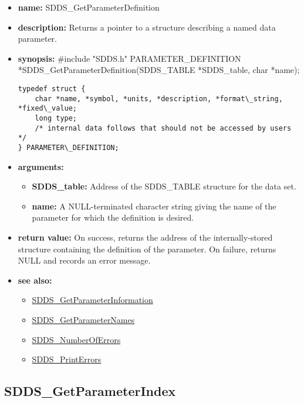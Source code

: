 \documentclass[11pt]{article}
\newcommand{\progref}[1]{\hyperref{SDDS_#1}{{\tt SDDS\_#1} (}{)}{SDDS_#1}}
\begin{document}
\begin{itemize}
\item {\bf name:}\newline
SDDS\_GetParameterDefinition
\item {\bf description:}\newline
Returns a pointer to a structure describing a named data parameter.
\item {\bf synopsis:} \#include "SDDS.h"\newline
PARAMETER\_DEFINITION *SDDS\_GetParameterDefinition(SDDS\_TABLE *SDDS\_table, char *name);\newline
\begin{verbatim}
typedef struct {
    char *name, *symbol, *units, *description, *format\_string, *fixed\_value;
    long type;
    /* internal data follows that should not be accessed by users */
} PARAMETER\_DEFINITION;
\end{verbatim}
\item {\bf arguments:}
\begin{itemize}
\item {\bf SDDS\_table:} Address of the SDDS\_TABLE structure for the data set.
\item {\bf name:} A NULL-terminated character string giving the name of the parameter for which the definition is desired.
\end{itemize}
\item {\bf return value:}\newline
On success, returns the address of the internally-stored structure containing the definition of the parameter. On failure, returns NULL and records an error message.
\item {\bf see also:}
\begin{itemize}
\item \progref{GetParameterInformation}
\item \progref{GetParameterNames}
\item \progref{NumberOfErrors}
\item \progref{PrintErrors}
\end{itemize}
\end{itemize}

\subsection{SDDS\_GetParameterIndex}
\label{SDDS_GetParameterIndex}
\end{document}
